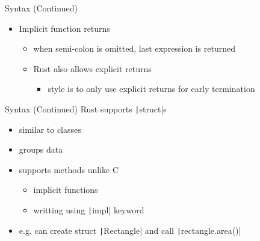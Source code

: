 \begin{frame}{Syntax (Continued)}
    \pause
    \begin{itemize}[<+->]
        \item Implicit function returns
            \begin{itemize}[<+->]
                \item when semi-colon is \alert{omitted}, last expression is
                      returned
                \item Rust also allows explicit returns
                \begin{itemize}[<+->]
                    \item style is to only use explicit returns for early
                          termination
                \end{itemize}
                \pause{}
            \end{itemize}
    \end{itemize}
\end{frame}

\begin{frame}{Syntax (Continued)}
    \pause
    Rust supports \texttt|struct|s
    \pause
    \begin{itemize}[<+->]
        \item similar to classes
        \item groups data
        \item supports \alert{methods} unlike C
        \begin{itemize}[<+->]
            \item implicit functions
            \item writting using \texttt|impl| keyword
        \end{itemize}
        \item e.g. can create struct \texttt|Rectangle| and call
              \texttt|rectangle.area()|
    \end{itemize}
\end{frame}
